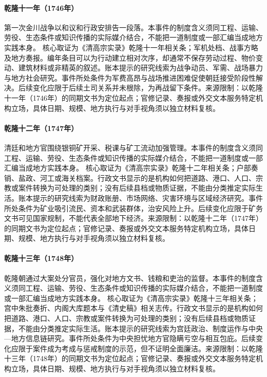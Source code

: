 \hypertarget{civic:EQ-1746-FIRST-JINCHUAN-SETTLEMENT}{}\paragraph{乾隆十一年（1746年）}第一次金川战争以和议和行政安排告一段落。本事件的制度含义须同工程、运输、劳役、生态条件或知识传播的实际媒介结合，不能把一道制度或一部汇编当成地方实践本身。 核心取证为《清高宗实录》乾隆十一年相关条；军机处档、战事方略及地方奏报。编年条目可以为行动建立相对次序，却通常不保存劳动过程、物价变动、建筑材料或非精英的叙述。账本提示的研究线索为战争动员、军需、战场暴力与地方社会研究。事件所处条件为军费高昂与战场推进困难促使朝廷接受阶段性解决。后续变化应限于后续土司关系并未根除，为再战留下条件。来源限制：以乾隆十一年（1746年）的同期文书为定位起点；官修记录、奏报或外交文本服务特定机构立场，具体日期、规模、地方执行与对手视角须以独立材料复核。
\hypertarget{civic:EQ-1747-SOUTHWEST-MINING-REGULATION}{}\paragraph{乾隆十二年（1747年）}清廷和地方官围绕银铜矿开采、税课与矿工流动加强管理。本事件的制度含义须同工程、运输、劳役、生态条件或知识传播的实际媒介结合，不能把一道制度或一部汇编当成地方实践本身。 核心取证为《清高宗实录》乾隆十二年相关条；户部奏销、盐政、河工或海关档案。行政文书显示的是机构如何把道路、港口、人口、宗教或案件转换为可处理的类别；没有后续县档或物质证据，不能由分类推定实际生活。账本提示的研究线索为财政账册、市场网络、灾害环境与区域经济研究。事件所处条件为矿业吸引流民、资本和武装群体，治安风险上升。后续变化应限于矿务文书可见国家规制，不能代表全部地下经济。来源限制：以乾隆十二年（1747年）的同期文书为定位起点；官修记录、奏报或外交文本服务特定机构立场，具体日期、规模、地方执行与对手视角须以独立材料复核。
\hypertarget{civic:EQ-1748-SONG-AND-CASE}{}\paragraph{乾隆十三年（1748年）}乾隆朝通过大案处分官员，强化对地方文书、钱粮和吏治的监督。本事件的制度含义须同工程、运输、劳役、生态条件或知识传播的实际媒介结合，不能把一道制度或一部汇编当成地方实践本身。 核心取证为《清高宗实录》乾隆十三年相关条；宫中朱批奏折、内阁大库题本与《清史稿》相关志传。行政文书显示的是机构如何把道路、港口、人口、宗教或案件转换为可处理的类别；没有后续县档或物质证据，不能由分类推定实际生活。账本提示的研究线索为宫廷政治、制度运作与中央—地方信息链研究。事件所处条件为中央担忧地方官隐瞒亏空与相互包庇。后续变化应限于案件成为考成与惩戒制度的示范，但不证明全面廉洁。来源限制：以乾隆十三年（1748年）的同期文书为定位起点；官修记录、奏报或外交文本服务特定机构立场，具体日期、规模、地方执行与对手视角须以独立材料复核。
